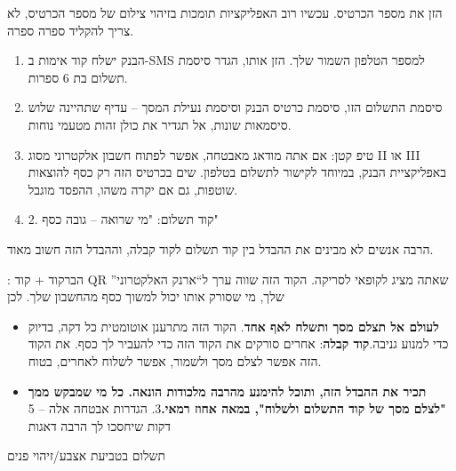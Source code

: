 


הזן את מספר הכרטיס. עכשיו רוב האפליקציות תומכות בזיהוי צילום של מספר הכרטיס, לא צריך להקליד ספרה ספרה.

\begin{enumerate}
  \item הבנק ישלח קוד אימות ב-SMS למספר הטלפון השמור שלך. הזן אותו, הגדר סיסמת תשלום בת 6 ספרות.
  \item סיסמת התשלום הזו, סיסמת כרטיס הבנק וסיסמת נעילת המסך – עדיף שתהיינה שלוש סיסמאות שונות, אל תגדיר את כולן זהות מטעמי נוחות.
  \item טיפ קטן: אם אתה מודאג מאבטחה, אפשר לפתוח חשבון אלקטרוני מסוג II או III באפליקציית הבנק, במיוחד לקישור לתשלום בטלפון. שים בכרטיס הזה רק כסף להוצאות שוטפות, גם אם יקרה משהו, ההפסד מוגבל.
  \item 2. קוד תשלום: "מי שרואה – גובה כסף"
\end{enumerate}

הרבה אנשים לא מבינים את ההבדל בין קוד תשלום לקוד קבלה, וההבדל הזה חשוב מאוד.


: הברקוד + קוד QR שאתה מציג לקופאי לסריקה. הקוד הזה שווה ערך ל“ארנק האלקטרוני” שלך, מי שסורק אותו יכול למשוך כסף מהחשבון שלך. לכן

\begin{itemize}
  \item \textbf{לעולם אל תצלם מסך ותשלח לאף אחד}. הקוד הזה מתרענן אוטומטית כל דקה, בדיוק כדי למנוע גניבה.\textbf{קוד קבלה}: אחרים סורקים את הקוד הזה כדי להעביר לך כסף. את הקוד הזה אפשר לצלם מסך ולשמור, אפשר לשלוח לאחרים, בטוח.
  \item \textbf{תכיר את ההבדל הזה, ותוכל להימנע מהרבה מלכודות הונאה. כל מי שמבקש ממך "לצלם מסך של קוד התשלום ולשלוח", במאה אחוז רמאי.}3. הגדרות אבטחה אלה – 5 דקות שיחסכו לך הרבה דאגות
\end{itemize}

תשלום בטביעת אצבע/זיהוי פנים



